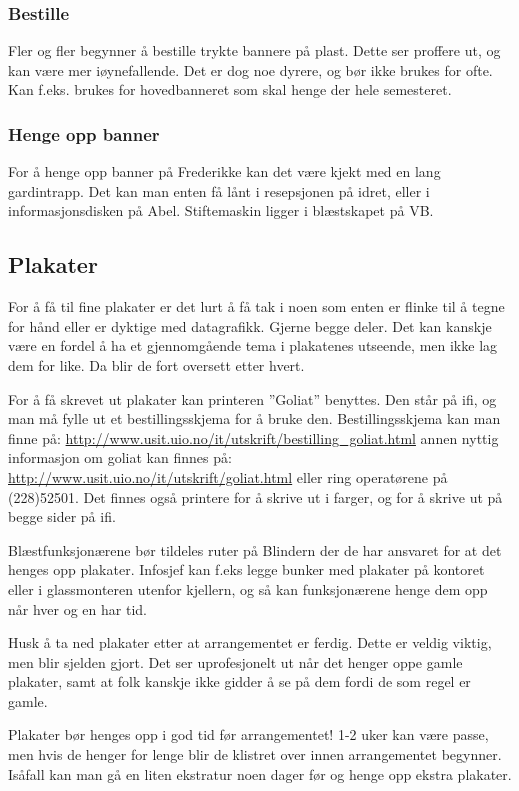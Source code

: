 \subsubsection{Bestille}
Fler og fler begynner å bestille trykte bannere på plast. Dette ser proffere ut, og kan være mer iøynefallende. Det er dog noe dyrere, og bør ikke brukes for ofte. Kan f.eks. brukes for hovedbanneret som skal henge der hele semesteret.
\subsubsection{Henge opp banner}
For å henge opp banner på Frederikke kan det være kjekt med en lang 
gardintrapp. Det kan man enten få lånt i resepsjonen på idret, eller i
informasjonsdisken på Abel. Stiftemaskin ligger i blæstskapet på VB.


\subsection{Plakater}
For å få til fine plakater er det lurt å få tak i noen som enten
er flinke til å tegne for hånd eller er dyktige med datagrafikk.
Gjerne begge deler. Det kan kanskje være en fordel å ha et gjennomgående
tema i plakatenes utseende, men ikke lag dem for like. Da blir
de fort oversett etter hvert.

For å få skrevet ut plakater kan printeren ''Goliat'' benyttes. Den står på 
ifi, og man må fylle ut et bestillingsskjema for å bruke den. 
Bestillingsskjema kan man finne på:
\url{http://www.usit.uio.no/it/utskrift/bestilling\_goliat.html}
annen nyttig informasjon om goliat kan finnes på:
\url{http://www.usit.uio.no/it/utskrift/goliat.html}
eller ring operatørene på (228)52501.
Det finnes også printere for å skrive ut i farger, og for å skrive ut på begge sider på ifi.

Blæstfunksjonærene bør tildeles ruter på Blindern der de har ansvaret
for at det henges opp plakater. Infosjef kan f.eks legge bunker med
plakater på kontoret eller i glassmonteren utenfor kjellern, og så
kan funksjonærene henge dem opp når hver og en har tid.

Husk å ta ned plakater etter at arrangementet er ferdig. Dette er
veldig viktig, men blir sjelden gjort. Det ser uprofesjonelt ut når det
henger oppe gamle plakater, samt at folk kanskje ikke gidder å se på dem
fordi de som regel er gamle.

Plakater bør henges opp i god tid før arrangementet! 1-2 uker kan være passe, men hvis de henger for lenge blir de klistret over innen arrangementet begynner. Isåfall kan man gå en liten ekstratur noen dager før og henge opp ekstra plakater.


